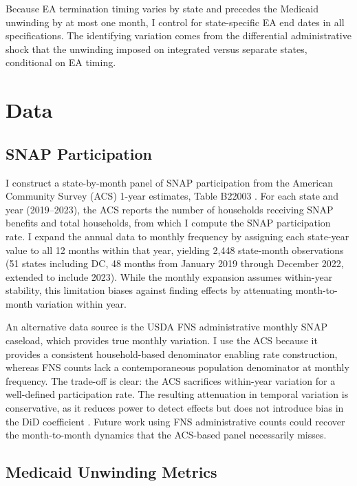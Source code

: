 \documentclass[12pt]{article}
\begin{document}
Because EA termination timing varies by state and precedes the Medicaid unwinding by at most one month, I control for state-specific EA end dates in all specifications. The identifying variation comes from the differential administrative shock that the unwinding imposed on integrated versus separate states, conditional on EA timing.


\section{Data}
\label{sec:data}

\subsection{SNAP Participation}

I construct a state-by-month panel of SNAP participation from the American Community Survey (ACS) 1-year estimates, Table B22003 \citep{acs2023}. For each state and year (2019--2023), the ACS reports the number of households receiving SNAP benefits and total households, from which I compute the SNAP participation rate. I expand the annual data to monthly frequency by assigning each state-year value to all 12 months within that year, yielding 2,448 state-month observations (51 states including DC, 48 months from January 2019 through December 2022, extended to include 2023). While the monthly expansion assumes within-year stability, this limitation biases against finding effects by attenuating month-to-month variation within year.

An alternative data source is the USDA FNS administrative monthly SNAP caseload, which provides true monthly variation. I use the ACS because it provides a consistent household-based denominator enabling rate construction, whereas FNS counts lack a contemporaneous population denominator at monthly frequency. The trade-off is clear: the ACS sacrifices within-year variation for a well-defined participation rate. The resulting attenuation in temporal variation is conservative, as it reduces power to detect effects but does not introduce bias in the DiD coefficient \citep{bertrand2004}. Future work using FNS administrative counts could recover the month-to-month dynamics that the ACS-based panel necessarily misses.

\subsection{Medicaid Unwinding Metrics}
\end{document}
